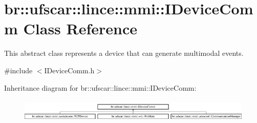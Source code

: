 \hypertarget{classbr_1_1ufscar_1_1lince_1_1mmi_1_1IDeviceComm}{
\section{br::ufscar::lince::mmi::IDeviceComm Class Reference}
\label{classbr_1_1ufscar_1_1lince_1_1mmi_1_1IDeviceComm}
}


This abstract class represents a device that can generate multimodal events.  




{\ttfamily \#include $<$IDeviceComm.h$>$}

Inheritance diagram for br::ufscar::lince::mmi::IDeviceComm:\begin{figure}[H]
\begin{center}
\leavevmode
\includegraphics[height=1.1245cm]{classbr_1_1ufscar_1_1lince_1_1mmi_1_1IDeviceComm}
\end{center}
\end{figure}
